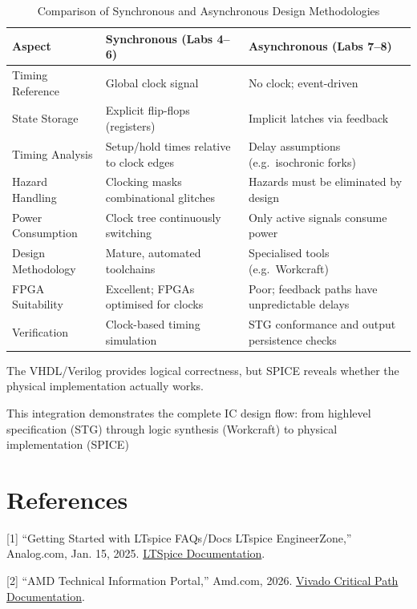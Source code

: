 \documentclass[a4paper,12pt]{article}
\begin{document}
\begin{table}[h]
\centering
\caption{Comparison of Synchronous and Asynchronous Design Methodologies}
\label{tab:sync_async_comparison}
\renewcommand{\arraystretch}{1.3}
\begin{tabular}{|p{3.2cm}|p{5.2cm}|p{5.2cm}|}
\hline
\textbf{Aspect} & \textbf{Synchronous (Labs 4--6)} & \textbf{Asynchronous (Labs 7--8)} \\ \hline
Timing Reference & Global clock signal & No clock; event-driven \\ \hline
State Storage & Explicit flip-flops (registers) & Implicit latches via feedback \\ \hline
Timing Analysis & Setup/hold times relative to clock edges & Delay assumptions (e.g.\ isochronic forks) \\ \hline
Hazard Handling & Clocking masks combinational glitches & Hazards must be eliminated by design \\ \hline
Power Consumption & Clock tree continuously switching & Only active signals consume power \\ \hline
Design Methodology & Mature, automated toolchains & Specialised tools (e.g.\ Workcraft) \\ \hline
FPGA Suitability & Excellent; FPGAs optimised for clocks & Poor; feedback paths have unpredictable delays \\ \hline
Verification & Clock-based timing simulation & STG conformance and output persistence checks \\ \hline
\end{tabular}
\end{table}

The VHDL/Verilog provides logical correctness, but SPICE reveals whether the physical implementation actually works.

This integration demonstrates the complete IC design flow: from high\-level specification (STG) through logic synthesis (Workcraft) to physical implementation (SPICE)

\section{References}

[1] ``Getting Started with LTspice \- FAQs/Docs \- LTspice \- EngineerZone,” Analog.com, Jan. 15, 2025. \href{https://ez.analog.com/design-tools-and-calculators/ltspice/a/faqs-docs/c/getting-started-with-ltspice}{LTSpice Documentation}.

[2] ``AMD Technical Information Portal,” Amd.com, 2026. \href{https://docs.amd.com/r/en-US/ug906-vivado-design-analysis/Timing-Path-Details-in-Vivado-IDE}{Vivado Critical Path Documentation}.
\end{document}
